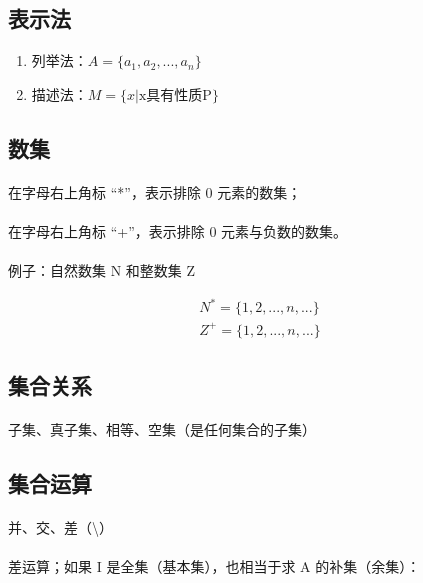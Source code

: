 \subsection{表示法}
\begin{enumerate}
  \item 列举法：$A = \{a_1, a_2, ..., a_n\}$
  \item 描述法：$M = \{x | \text{x具有性质P} \}$
\end{enumerate}

\subsection{数集}
\paragraph{}
在字母右上角标 “*”，表示排除 0 元素的数集；
\paragraph{}
在字母右上角标 “+”，表示排除 0 元素与负数的数集。
\paragraph{}
例子：自然数集 N 和整数集 Z

\begin{gather}
N^* = \{1, 2, ..., n, ...\} \\
Z^+ = \{1, 2, ..., n, ...\}
\end{gather}

\subsection{集合关系}
\paragraph{}
子集、真子集、相等、空集（是任何集合的子集）

\subsection{集合运算}
\paragraph{}
并、交、差（\textbackslash）
\paragraph{}
差运算；如果 I 是全集（基本集），也相当于求 A 的补集（余集）：

